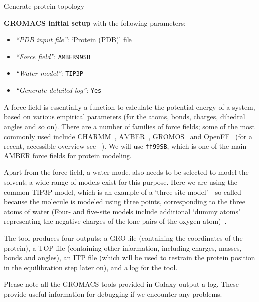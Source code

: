 \documentclass[twocolumn]{bmcart}%
\providecommand{\tightlist}{%
  \setlength{\itemsep}{0pt}\setlength{\parskip}{0pt}}
\begin{document}
\begin{handson_box_colour}{Generate protein topology}

  \textbf{GROMACS initial setup} with the following parameters:

  \begin{itemize}
  \tightlist
  \item
    \emph{``PDB input file''}: `Protein (PDB)' file
  \item
    \emph{``Force field''}: \texttt{AMBER99SB}
  \item
    \emph{``Water model''}: \texttt{TIP3P}
  \item
    \emph{``Generate detailed log''}: \texttt{Yes}
  \end{itemize}
\end{handson_box_colour}

A force field is essentially a function to calculate the potential energy of a system, based on various empirical parameters (for the atoms, bonds, charges, dihedral angles and so on). There are a number of families of force fields; some of the most commonly used include CHARMM~\cite{Vanommeslaeghe2009}, AMBER~\cite{Maier2015}, GROMOS~\cite{reif2012} and OpenFF~\cite{Mobley2018} (for a recent, accessible overview see ~\cite{Lemkul2020}). We will use \texttt{ff99SB}, which is one of the main AMBER force fields for protein modeling.

Apart from the force field, a water model also needs to be selected to model the solvent; a wide range of models exist for this purpose. Here we are using the common TIP3P model, which is an example of a `three-site model' - so-called because the molecule is modeled using three points, corresponding to the three atoms of water (Four- and five-site models include additional `dummy atoms' representing the negative charges of the lone pairs of the oxygen atom)~\cite{Onufriev2017}.

The tool produces four outputs: a GRO file (containing the coordinates
of the protein), a TOP file (containing other information, including
charges, masses, bonds and angles), an ITP file (which will be used to
restrain the protein position in the equilibration step later on), and a
log for the tool.

Please note all the GROMACS tools provided in Galaxy output a log. These provide useful information for
debugging if we encounter any problems.
\end{document}

